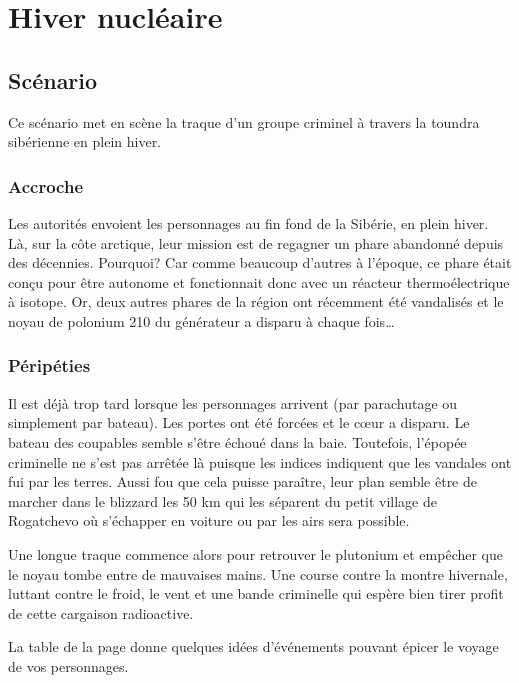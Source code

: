 \chapter{Hiver nucléaire}

\section{Scénario}

Ce scénario met en scène la traque d'un groupe criminel à travers la toundra sibérienne en plein hiver.

\subsection{Accroche}

Les autorités envoient les personnages au fin fond de la Sibérie, en plein hiver.
Là, sur la côte arctique, leur mission est de regagner un phare abandonné depuis des décennies.
Pourquoi? Car comme beaucoup d'autres à l'époque, ce phare était conçu pour être autonome et fonctionnait donc avec un réacteur thermoélectrique à isotope.
Or, deux autres phares de la région ont récemment été vandalisés et le noyau de polonium 210 du générateur a disparu à chaque fois\dots

\subsection{Péripéties}

Il est déjà trop tard lorsque les personnages arrivent (par parachutage ou simplement par bateau).
Les portes ont été forcées et le cœur a disparu.
Le bateau des coupables semble s'être échoué dans la baie.
Toutefois, l'épopée criminelle ne s'est pas arrêtée là puisque les indices indiquent que les vandales ont fui par les terres.
Aussi fou que cela puisse paraître, leur plan semble être de marcher dans le blizzard les 50 km qui les séparent du petit village de Rogatchevo où s'échapper en voiture ou par les airs sera possible.

Une longue traque commence alors pour retrouver le plutonium et empêcher que le noyau tombe entre de mauvaises mains.
Une course contre la montre hivernale, luttant contre le froid, le vent et une bande criminelle qui espère bien tirer profit de cette cargaison radioactive.

La table de la page \pageref{table:hiver} donne quelques idées d'événements pouvant épicer le voyage de vos personnages.

